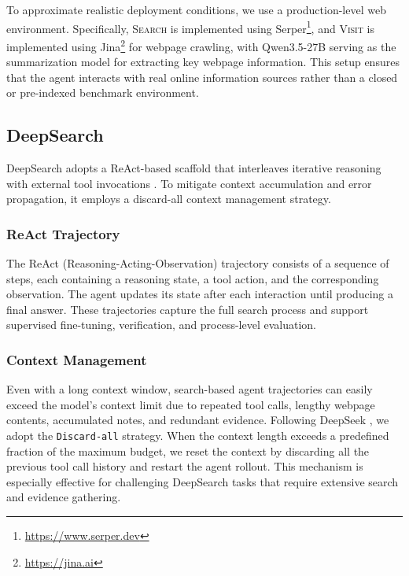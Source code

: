 \documentclass{huawei}
\begin{document}
To approximate realistic deployment conditions, we use a production-level web environment. Specifically, \textsc{Search} is implemented using Serper\footnote{\url{https://www.serper.dev}}, and \textsc{Visit} is implemented using Jina\footnote{\url{https://jina.ai}} for webpage crawling, with Qwen3.5-27B serving as the summarization model for extracting key webpage information. This setup ensures that the agent interacts with real online information sources rather than a closed or pre-indexed benchmark environment.


\subsection{DeepSearch}
DeepSearch adopts a ReAct-based scaffold that interleaves iterative reasoning with external tool invocations \cite{yao2022react}. To mitigate context accumulation and error propagation, it employs a discard-all context management strategy.


\subsubsection{ReAct Trajectory}
The ReAct (Reasoning-Acting-Observation) trajectory consists of a sequence of steps, each containing a reasoning state, a tool action, and the corresponding observation. The agent updates its state after each interaction until producing a final answer. These trajectories capture the full search process and support supervised fine-tuning, verification, and process-level evaluation.

\subsubsection{Context Management}
Even with a long context window, search-based agent trajectories can easily exceed the model's context limit due to repeated tool calls, lengthy webpage contents, accumulated notes, and redundant evidence. Following DeepSeek \cite{xu2026deepseek}, we adopt the \texttt{Discard-all} strategy. When the context length exceeds a predefined fraction of the maximum budget, we reset the context by discarding all the previous tool call history and restart the agent rollout. This mechanism is especially effective for challenging DeepSearch tasks that require extensive search and evidence gathering.

\end{document}
